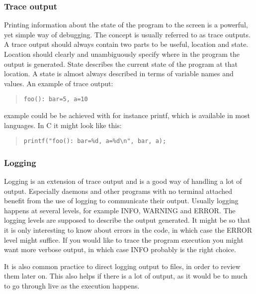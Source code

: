 \documentclass[11pt,a4paper,twoside]{article}
\begin{document}
\subsubsection{Trace output}

Printing information about the state of the program to the screen is a
powerful, yet simple way of debugging. The concept is usually referred to as
trace outputs. A trace output should always contain two parts to be useful,
location and state. Location should clearly and unambiguously specify where in
the program the output is generated. State describes the current state of the
program at that location. A state is almost always described in terms of
variable names and values. An example of trace output:

\begin{quote}
\begin{verbatim}
foo(): bar=5, a=10
\end{verbatim}
\end{quote}

 example could be be achieved with for instance printf, which is available
in most languages. In C it might look like this:

\begin{quote}
\begin{verbatim}
printf("foo(): bar=%d, a=%d\n", bar, a);
\end{verbatim}
\end{quote}


\subsubsection{Logging}

Logging is an extension of trace output and is a good way of handling a lot of
output. Especially daemons and other programs with no terminal attached benefit
from the use of logging to communicate their output. Usually logging happens at
several levels, for example \textsc{INFO}, \textsc{WARNING} and \textsc{ERROR}.
The logging levels are supposed to describe the output generated. It might be
so that it is only interesting to know about errors in the code, in which case
the \textsc{ERROR} level might suffice. If you would like to trace the program
execution you might want more verbose output, in which case \textsc{INFO}
probably is the right choice. 

It is also common practice to direct logging output to files, in order to
review them later on. This also helps if there is a lot of output, as it would
be to much to go through live as the execution happens.
\end{document}
